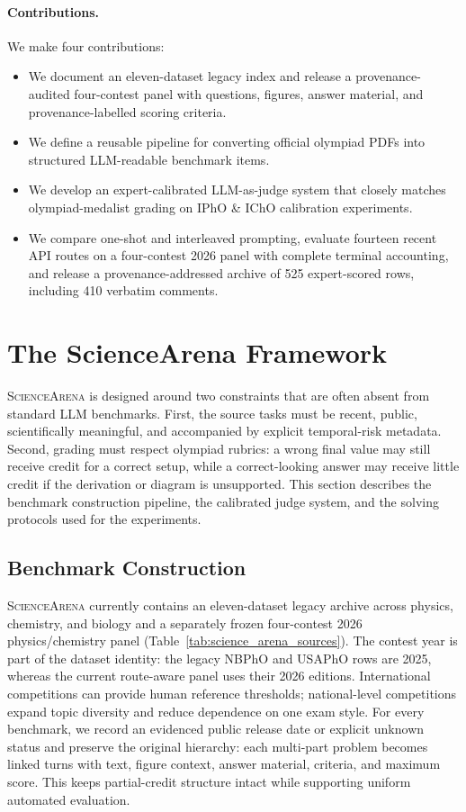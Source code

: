 \documentclass[11pt]{article}
\begin{document}
\paragraph{Contributions.}
We make four contributions:
\begin{itemize}[leftmargin=0.5em,itemsep=0.1em]
    \item We document an eleven-dataset legacy index and release a provenance-audited four-contest panel with questions, figures, answer material, and provenance-labelled scoring criteria.
    \item We define a reusable pipeline for converting official olympiad PDFs into structured LLM-readable benchmark items.
    \item We develop an expert-calibrated LLM-as-judge system that closely matches olympiad-medalist grading on IPhO \& IChO calibration experiments.
    \item We compare one-shot and interleaved prompting, evaluate fourteen recent API routes on a four-contest 2026 panel with complete terminal accounting, and release a provenance-addressed archive of 525 expert-scored rows, including 410 verbatim comments.
\end{itemize}








\section{The ScienceArena Framework}\label{sec:2}
\textsc{ScienceArena} is designed around two constraints that are often absent from standard LLM benchmarks.
First, the source tasks must be recent, public, scientifically meaningful, and accompanied by explicit temporal-risk metadata.
Second, grading must respect olympiad rubrics: a wrong final value may still receive credit for a correct setup, while a correct-looking answer may receive little credit if the derivation or diagram is unsupported.
This section describes the benchmark construction pipeline, the calibrated judge system, and the solving protocols used for the experiments.


\subsection{Benchmark Construction}
\textsc{ScienceArena} currently contains an eleven-dataset legacy archive across physics, chemistry, and biology and a separately frozen four-contest 2026 physics/chemistry panel (Table~\ref{tab:science_arena_sources}).
The contest year is part of the dataset identity: the legacy NBPhO and USAPhO rows are 2025, whereas the current route-aware panel uses their 2026 editions. International competitions can provide human reference thresholds; national-level competitions expand topic diversity and reduce dependence on one exam style.
For every benchmark, we record an evidenced public release date or explicit unknown status and preserve the original hierarchy: each multi-part problem becomes linked turns with text, figure context, answer material, criteria, and maximum score.
This keeps partial-credit structure intact while supporting uniform automated evaluation.
\end{document}
